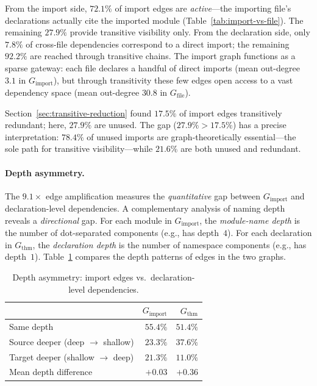 From the import side, $72.1\%$ of import edges are \emph{active}---the importing file's declarations actually cite the imported module (Table~\ref{tab:import-vs-file}). The remaining $27.9\%$ provide transitive visibility only. From the declaration side, only $7.8\%$ of cross-file dependencies correspond to a direct import; the remaining $92.2\%$ are reached through transitive chains. The import graph functions as a sparse gateway: each file declares a handful of direct imports (mean out-degree $3.1$ in $G_{\mathrm{import}}$), but through transitivity these few edges open access to a vast dependency space (mean out-degree $30.8$ in $G_{\mathrm{file}}$).

\begin{remark}
\label{rem:unused-vs-redundant}
Section~\ref{sec:transitive-reduction} found $17.5\%$ of import edges transitively redundant; here, $27.9\%$ are unused. The gap ($27.9\% > 17.5\%$) has a precise interpretation: $78.4\%$ of unused imports are graph-theoretically essential---the sole path for transitive visibility---while $21.6\%$ are both unused and redundant.
\end{remark}

\paragraph{Depth asymmetry.}
\label{sec:depth-asymmetry}

\noindent The $9.1\times$ edge amplification measures the \emph{quantitative} gap between $G_{\mathrm{import}}$ and declaration-level dependencies. A complementary analysis of naming depth reveals a \emph{directional} gap. For each module in $G_{\mathrm{import}}$, the \emph{module-name depth} is the number of dot-separated components (e.g.,  has depth~$4$). For each declaration in $G_{\mathrm{thm}}$, the \emph{declaration depth} is the number of namespace components (e.g.,  has depth~$1$). Table~\ref{tab:depth-asymmetry} compares the depth patterns of edges in the two graphs.

\begin{table}[ht]
\centering
\caption{Depth asymmetry: import edges vs.\ declaration-level dependencies.}
\label{tab:depth-asymmetry}
\begin{tabular}{lrr}
\toprule
& $G_{\mathrm{import}}$ & $G_{\mathrm{thm}}$ \\
\midrule
Same depth                         & $55.4\%$ & $51.4\%$ \\
Source deeper (deep $\to$ shallow) & $23.3\%$ & $37.6\%$ \\
Target deeper (shallow $\to$ deep) & $21.3\%$ & $11.0\%$ \\
Mean depth difference              & $+0.03$  & $+0.36$  \\
\bottomrule
\end{tabular}
\end{table}

